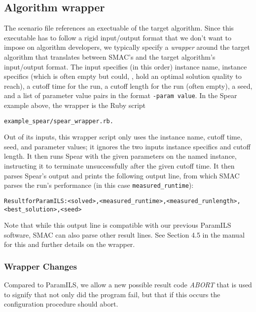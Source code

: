 \documentclass[11pt,letterpaper,twoside]{article}
\begin{document}
\subsection{Algorithm wrapper}
The scenario file references an exectuable of the target algorithm. Since this executable has to follow a rigid input/output format that we don't want to impose on algorithm developers, we typically specify a \emph{wrapper} around the target algorithm that translates between SMAC's and the target algorithm's input/output format.
The input specifies (in this order) instance name, instance specifics (which is often empty but could, \eg{}, hold an optimal solution quality to reach), a cutoff time for the run, a cutoff length for the run (often empty), a seed, and a list of parameter value pairs in the format {\footnotesize\texttt{-param value}}. 
In the Spear example above, the wrapper is the Ruby script 

{\footnotesize
\begin{alltt}
example_spear/spear_wrapper.rb.
\end{alltt}
}

Out of its inputs, this wrapper script only uses the instance name, cutoff time, seed, and parameter values; it ignores the two inputs instance specifics and cutoff length. It then runs Spear with the given parameters on the named instance, instructing it to terminate unsuccessfully after the given cutoff time. It then parses Spear's output and prints the following output line, from which SMAC parses the run's performance (in this case \texttt{\footnotesize{measured\_runtime}}):

{\footnotesize
\begin{alltt}
Result for ParamILS: <solved>, <measured_runtime>, <measured_runlength>, 
<best_solution>, <seed>
\end{alltt}
}

Note that while this output line is compatible with our previous ParamILS software, SMAC can also parse other result lines. See Section 4.5 in the manual for this and further details on the wrapper.

\subsubsection{Wrapper Changes}
Compared to ParamILS, we allow a new possible result code \emph{ABORT} that is used to signify that not only did the program fail, but that if this occurs the configuration procedure should abort.
\end{document}
